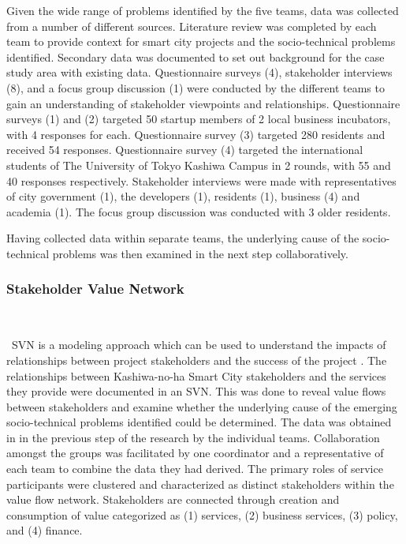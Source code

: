 \documentclass[conference]{IEEEtran}
\begin{document}
Given the wide range of problems identified by the five teams, data was collected from a number of different sources. Literature review was completed by each team to provide context for smart city projects and the socio-technical problems identified. Secondary data was documented to set out background for the case study area with existing data. Questionnaire surveys (4), stakeholder interviews (8), and a focus group discussion (1) were conducted by the different teams to gain an understanding of stakeholder viewpoints and relationships. Questionnaire surveys (1) and (2) targeted 50 startup members of 2 local business incubators, with 4 responses for each. Questionnaire survey (3) targeted 280 residents and received 54 responses. Questionnaire survey (4) targeted the international students of The University of Tokyo Kashiwa Campus in 2 rounds, with 55 and 40 responses respectively. Stakeholder interviews were made with representatives of city government (1), the developers (1), residents (1), business (4) and academia (1). The focus group discussion was conducted with 3 older residents.

Having collected data within separate teams, the underlying cause of the socio-technical problems was then examined in the next step collaboratively.

\subsubsection{\textbf{Stakeholder Value Network}}\

\
SVN is a modeling approach which can be used to understand the impacts of relationships between project stakeholders and the success of the project \cite{feng2010dependency}. The relationships between Kashiwa-no-ha Smart City stakeholders and the services they provide were documented in an SVN. This was done to reveal value flows between stakeholders and  examine whether the underlying cause of the emerging socio-technical problems identified could be determined. The data was obtained in in the previous step of the research by the individual teams. Collaboration amongst the groups was facilitated by one coordinator and a representative of each team to combine the data they had derived. The primary roles of service participants were clustered and characterized as distinct stakeholders within the value flow network. Stakeholders are connected through creation and consumption of value categorized as (1) services, (2) business services, (3) policy, and (4) finance.
\end{document}
